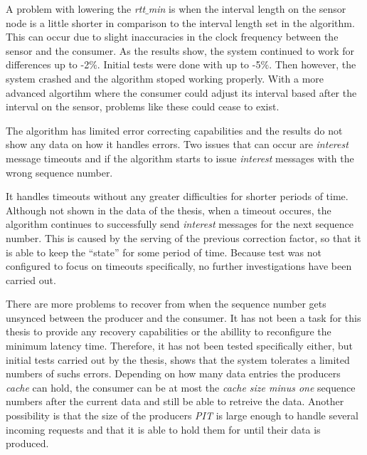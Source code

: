 A problem with lowering the \textit{rtt$\_$min} is when the interval length on the sensor node is a little shorter in comparison to the interval length set in the algorithm. This can occur due to slight inaccuracies in the clock frequency between the sensor and the consumer. 
As the results show, the system continued to work for differences up to -2$\%$. Initial tests were done with up to -5$\%$. Then however, the system crashed and the algorithm stoped working properly. With a more advanced algortihm where the consumer could adjust its interval based after the interval on the sensor, problems like these could cease to exist.

%	

The algorithm has limited error correcting capabilities and the results do not show any data on how it handles errors. Two issues that can occur are \textit{interest} message timeouts and if the algorithm starts to issue \textit{interest} messages with the wrong sequence number. 

It handles timeouts without any greater difficulties for shorter periods of time. Although not shown in the data of the thesis, when a timeout occures, the algorithm continues to successfully send \textit{interest} messages for the next sequence number. This is caused by the serving of the previous correction factor, so that it is able to keep the ``state'' for some period of time. Because test was not configured to focus on timeouts specifically, no further investigations have been carried out.

There are more problems to recover from when the sequence number gets unsynced between the producer and the consumer. 
It has not been a task for this thesis to provide any recovery capabilities or the abillity to reconfigure the minimum latency time. Therefore, it has not been tested specifically either, but initial tests carried out by the thesis, shows that the system tolerates a limited numbers of suchs errors. Depending on how many data entries the producers \textit{cache} can hold, the consumer can be at most the \textit{cache size minus one} sequence numbers after the current data and still be able to retreive the data. 
Another possibility is that the size of the producers \textit{PIT} is large enough to handle several incoming requests and that it is able to hold them for until their data is produced. 




